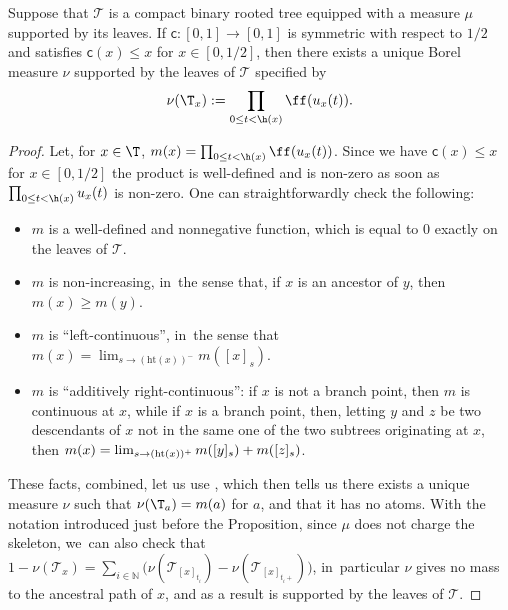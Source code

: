 \begin{prop}[Definition of $\nu$]\label{prop:def:nu} Suppose that $ \mathcal{T}$ is a compact binary rooted tree equipped with a measure $\mu$ supported by its leaves. If $\mathsf{c}:[0,1] \to [0,1]$ is symmetric with respect to $1/2$ and satisfies $ \mathsf{c}(x) \leq x$ for $x \in [0,1/2]$, then there exists a unique Borel measure $\nu$ supported by the leaves of $ \mathcal{T}$ specified by
\begin{equation} \nu(\T_x) := \prod_{0 \leq t < \h(x)} \ff(u_x(t)).
\end{equation}
\end{prop}
\begin{proof} Let, for $x\in\T$, $m(x)=\prod_{0 \leq t < \h(x)} \ff(u_x(t))$. Since we have $ \mathsf{c}(x) \leq x$ for $x \in [0,1/2]$ the product is well-defined and is non-zero as soon as $\prod_{0 \leq t < \h(x)} u_x(t)$ is non-zero. One can straightforwardly check the following:
\begin{itemize}
\item $m$ is a well-defined and nonnegative function, which is equal to $0$ exactly on the leaves of $ \mathcal{T}$.
\item $m$ is non-increasing, in~the sense that, if $x$ is an ancestor of $y$, then $m(x)\geq m(y)$.
\item $m$ is ``left-continuous'', in~the sense that $m(x)=\lim_{s\to (\mathrm{ht}(x))^{-}} m([x]_s)$.
\item $m$ is ``additively right-continuous'': if $x$ is not a branch point, then $m$ is continuous at $x$, while if $x$ is a branch point, then, letting $y$ and $z$ be two descendants of $x$ not in the same one of the two subtrees originating at $x$, then $m(x)= \lim_{s\to (\mathrm{ht}(x))^+} m([y]_s)+\nobreak m([z]_s)$.
\end{itemize}
These facts, combined, let us use \cite[Prop.\,1]{Steph13}, which then tells us there exists a unique measure $\nu$ such that $\nu(\T_a)=m(a)$ for $a$, and that it has no atoms. With the notation introduced just before the Proposition, since $\mu$ does not charge the skeleton, we~can also check that $1-\nu(\mathcal{T}_x) = \sum_{i \in \mathbb{N}} \big(\nu (\mathcal{T}_{[x]_{t_i}}) -\nu (\mathcal{T}_{[x]_{t_i +}})\big)$, in~particular $\nu$ gives no mass to the ancestral path of $x$, and as a result is supported by the leaves of $ \mathcal{T}$.
\end{proof}

